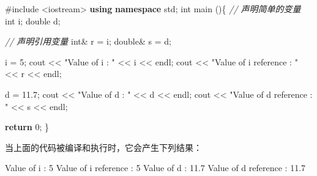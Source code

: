 \documentclass[
]{article}
\newenvironment{Shaded}{}{}
\newcommand{\CommentTok}[1]{\textcolor[rgb]{0.38,0.63,0.69}{\textit{#1}}}
\newcommand{\ControlFlowTok}[1]{\textcolor[rgb]{0.00,0.44,0.13}{\textbf{#1}}}
\newcommand{\DataTypeTok}[1]{\textcolor[rgb]{0.56,0.13,0.00}{#1}}
\newcommand{\DecValTok}[1]{\textcolor[rgb]{0.25,0.63,0.44}{#1}}
\newcommand{\FloatTok}[1]{\textcolor[rgb]{0.25,0.63,0.44}{#1}}
\newcommand{\ImportTok}[1]{#1}
\newcommand{\KeywordTok}[1]{\textcolor[rgb]{0.00,0.44,0.13}{\textbf{#1}}}
\newcommand{\NormalTok}[1]{#1}
\newcommand{\OperatorTok}[1]{\textcolor[rgb]{0.40,0.40,0.40}{#1}}
\newcommand{\PreprocessorTok}[1]{\textcolor[rgb]{0.74,0.48,0.00}{#1}}
\newcommand{\StringTok}[1]{\textcolor[rgb]{0.25,0.44,0.63}{#1}}
\begin{document}
\begin{Shaded}
\begin{Highlighting}[]
\PreprocessorTok{\#include }\ImportTok{\textless{}iostream\textgreater{}}
\KeywordTok{using} \KeywordTok{namespace}\NormalTok{ std}\OperatorTok{;}
\DataTypeTok{int}\NormalTok{ main }\OperatorTok{()\{}
   \CommentTok{// 声明简单的变量}
   \DataTypeTok{int}\NormalTok{    i}\OperatorTok{;}
   \DataTypeTok{double}\NormalTok{ d}\OperatorTok{;}
 
   \CommentTok{// 声明引用变量}
   \DataTypeTok{int}\OperatorTok{\&}\NormalTok{    r }\OperatorTok{=}\NormalTok{ i}\OperatorTok{;}
   \DataTypeTok{double}\OperatorTok{\&}\NormalTok{ s }\OperatorTok{=}\NormalTok{ d}\OperatorTok{;}
   
\NormalTok{   i }\OperatorTok{=} \DecValTok{5}\OperatorTok{;}
\NormalTok{   cout }\OperatorTok{\textless{}\textless{}} \StringTok{"Value of i : "} \OperatorTok{\textless{}\textless{}}\NormalTok{ i }\OperatorTok{\textless{}\textless{}}\NormalTok{ endl}\OperatorTok{;}
\NormalTok{   cout }\OperatorTok{\textless{}\textless{}} \StringTok{"Value of i reference : "} \OperatorTok{\textless{}\textless{}}\NormalTok{ r  }\OperatorTok{\textless{}\textless{}}\NormalTok{ endl}\OperatorTok{;}
 
\NormalTok{   d }\OperatorTok{=} \FloatTok{11.7}\OperatorTok{;}
\NormalTok{   cout }\OperatorTok{\textless{}\textless{}} \StringTok{"Value of d : "} \OperatorTok{\textless{}\textless{}}\NormalTok{ d }\OperatorTok{\textless{}\textless{}}\NormalTok{ endl}\OperatorTok{;}
\NormalTok{   cout }\OperatorTok{\textless{}\textless{}} \StringTok{"Value of d reference : "} \OperatorTok{\textless{}\textless{}}\NormalTok{ s  }\OperatorTok{\textless{}\textless{}}\NormalTok{ endl}\OperatorTok{;}
   
   \ControlFlowTok{return} \DecValTok{0}\OperatorTok{;}
\OperatorTok{\}}
\end{Highlighting}
\end{Shaded}

当上面的代码被编译和执行时，它会产生下列结果：

\begin{Shaded}
\begin{Highlighting}[]
\NormalTok{Value of i }\OperatorTok{:} \DecValTok{5}
\NormalTok{Value of i reference }\OperatorTok{:} \DecValTok{5}
\NormalTok{Value of d }\OperatorTok{:} \FloatTok{11.7}
\NormalTok{Value of d reference }\OperatorTok{:} \FloatTok{11.7}
\end{Highlighting}
\end{Shaded}
\end{document}
